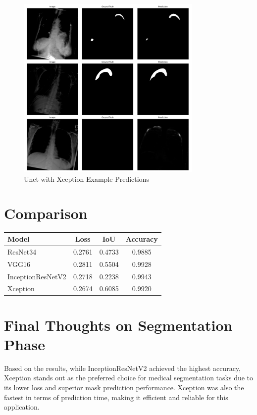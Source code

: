 \documentclass{article}
\begin{document}
\begin{figure}[H]
    \centering
    \includegraphics[width=0.8\textwidth]{plots/uxpp.pdf}
    \caption{Unet with Xception Example Predictions}
    \label{fig:unet_xception_p}
\end{figure}

\section*{Comparison}
\begin{tabular}{|l|c|c|c|}
\hline
\textbf{Model} & \textbf{Loss} & \textbf{IoU} & \textbf{Accuracy} \\
\hline
ResNet34 & 0.2761 & 0.4733 & 0.9885 \\
VGG16 & 0.2811 & 0.5504 & 0.9928 \\
InceptionResNetV2 & 0.2718 & 0.2238 & 0.9943 \\
Xception & 0.2674 & 0.6085 & 0.9920 \\
\hline
\end{tabular}

\section*{Final Thoughts on Segmentation Phase}
Based on the results, while InceptionResNetV2 achieved the highest accuracy, Xception stands out as the preferred choice for medical segmentation tasks due to its lower loss and superior mask prediction performance. Xception was also the fastest in terms of prediction time, making it efficient and reliable for this application.
\end{document}
